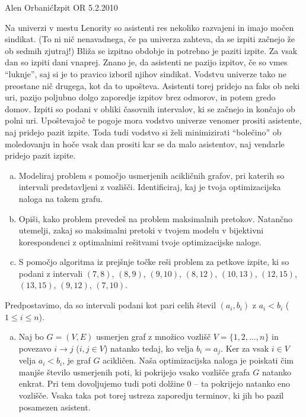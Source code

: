 \begin{naloga}{Alen Orbanić}{Izpit OR 5.2.2010}
\begin{vprasanje}
Na univerzi v mestu Lenority so asistenti res nekoliko razvajeni
in imajo močen sindikat.
(To ni nič nenavadnega, če pa univerza zahteva,
da se izpiti začnejo že ob sedmih zjutraj!)
Bliža se izpitno obdobje in potrebno je paziti izpite.
Za vsak dan so izpiti dani vnaprej.
Znano je, da asistenti ne pazijo izpitov, če so vmes ``luknje'',
saj si je to pravico izboril njihov sindikat.
Vodstvu univerze tako ne preostane nič drugega, kot da to upošteva.
Asistenti torej pridejo na faks ob neki uri,
pazijo poljubno dolgo zaporedje izpitov brez odmorov, in potem gredo domov.
Izpiti so podani v obliki časovnih intervalov,
ki se začnejo in končajo ob polni uri.
Upoštevajoč te pogoje mora vodstvo univerze venomer prositi asistente,
naj pridejo pazit izpite.
Toda tudi vodstvo si želi minimizirati ``bolečino'' ob moledovanju
in hoče vsak dan prositi kar se da malo asistentov,
naj vendarle pridejo pazit izpite.

\begin{enumerate}[(a)]
\item Modeliraj problem s pomočjo usmerjenih acikličnih grafov,
pri katerih so intervali predstavljeni z vozlišči.
Identificiraj, kaj je tvoja optimizacijska naloga na takem grafu.

\item Opiši, kako problem prevedeš na problem maksimalnih pretokov.
Natančno utemelji,
zakaj so maksimalni pretoki v tvojem modelu v bijektivni korespondenci
z optimalnimi rešitvami tvoje optimizacijske naloge.

\item S pomočjo algoritma iz prejšnje točke reši problem za petkove izpite,
ki so podani z intervali $(7, 8)$, $(8, 9)$, $(9, 10)$, $(8, 12)$,
$(10, 13)$, $(12, 15)$, $(13, 15)$, $(9, 12)$, $(7, 10)$.
\end{enumerate}
\end{vprasanje}

\begin{odgovor}
Predpostavimo,
da so intervali podani kot pari celih števil $(a_i, b_i)$ z $a_i < b_i$
($1 \le i \le n$).

\needspace{\baselineskip}
\begin{enumerate}[(a)]
\item Naj bo $G = (V, E)$ usmerjen graf
z množico vozlišč $V = \{1, 2, \dots, n\}$
in povezavo $i \to j$ ($i, j \in V$) natanko tedaj,
ko velja $b_i = a_j$.
Ker za vsak $i \in V$ velja $a_i < b_i$, je graf $G$ acikličen.
Naša optimizacijska naloga je poiskati čim manjše število usmerjenih poti,
ki pokrijejo vsako vozlišče grafa $G$ natanko enkrat.
Pri tem dovoljujemo tudi poti dolžine $0$
-- ta pokrijejo natanko eno vozlišče.
Vsaka taka pot torej ustreza zaporedju terminov,
ki jih bo pazil posamezen asistent.


\end{enumerate}
\end{odgovor}
\end{naloga}
